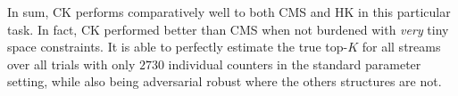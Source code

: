 In sum, CK performs comparatively well to both CMS and HK in this particular task. In fact, CK performed better than CMS when not burdened with \emph{very} tiny space constraints. It is able to perfectly estimate the true top-$K$ for all streams over all trials with only $2730$ individual counters in the standard parameter setting, while also being adversarial robust where the others structures are not. 





